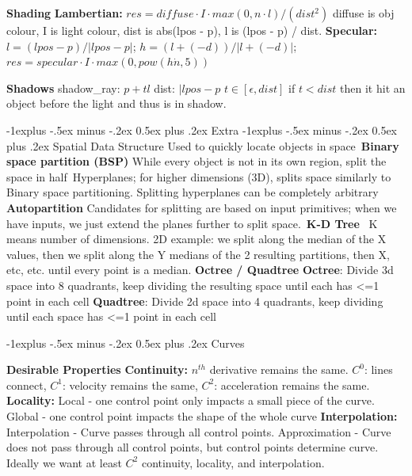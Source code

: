 \documentclass[letterpaper, 8pt]{extarticle}
\makeatletter
\renewcommand{\section}{\@startsection{section}{1}{0mm}%
                                {-1explus -.5ex minus -.2ex}%
                                {0.5ex plus .2ex}%
                                {\normalfont\small\bfseries}}
\renewcommand{\subsection}{\@startsection{subsection}{2}{0mm}%
                                {-1explus -.5ex minus -.2ex}%
                                {0.5ex plus .2ex}%
                                {\normalfont\tiny\bfseries}}
\makeatother
\begin{document}
\begin{multicols*}{4}
    \textbf{Shading}
    \textbf{Lambertian:} $res = diffuse \cdot I \cdot max(0, n \cdot l) / (dist^2)$
    diffuse is obj colour, I is light colour, dist is abs(lpos - p), l is (lpos - p) / dist.
    \textbf{Specular:}
    $l = (lpos - p) / |lpos - p|$;
    $h = (l + (-d)) / |l + (-d)|$;
    $res = specular \cdot I \cdot max(0, pow(h \dot n, 5))$

    \textbf{Shadows}
    shadow_ray: $p + t l$
    dist: $|lpos - p$
    $t \in [\epsilon, dist]$
    if $t < dist$ then it hit an object before the light and thus is in shadow.

    \section{Extra}
    \subsection{Spatial Data Structure}
    Used to quickly locate objects in space\
    \textbf{Binary space partition (BSP)}
    While every object is not in its own region, split the space in half\
    Hyperplanes; for higher dimensions (3D), splits space similarly to Binary space partitioning. Splitting hyperplanes can be completely arbitrary
    \textbf{Autopartition}
    Candidates for splitting are based on input primitives; when we have inputs, we just extend the planes further to split space.\
    \textbf{K-D Tree} \
    K means number of dimensions. 2D example: we split along the median of the X values, then we split along the Y medians of the 2 resulting partitions, then X, etc, etc. until every point is a median.
    \textbf{Octree / Quadtree}
    \textbf{Octree}: Divide 3d space into 8 quadrants, keep dividing the resulting space until each has <=1 point in each cell
    \textbf{Quadtree}: Divide 2d space into 4 quadrants, keep dividing until each space has <=1 point in each cell


    \section{Curves}

    \textbf{Desirable Properties}
    \textbf{Continuity:} $n^{th}$ derivative remains the same. $C^0$: lines connect,
    $C^1$: velocity remains the same,
    $C^2$: acceleration remains the same.
    \textbf{Locality:} Local - one control point only impacts a small piece of the curve.
    Global - one control point impacts the shape of the whole curve
    \textbf{Interpolation:} Interpolation - Curve passes through all control points.
    Approximation - Curve does not pass through all control points,
    but control points determine curve.
    Ideally we want at least $C^2$ continuity,
    locality, and interpolation.


\end{multicols*}
\end{document}
